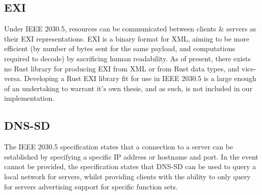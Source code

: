 \subsection{EXI}
Under IEEE 2030.5, resources can be communicated between clients \& servers as their EXI representations. EXI is a binary format for XML, aiming to be more efficient (by number of bytes sent for the same payload, and computations required to decode) by sacrificing human readability. As of present, there exists no Rust library for producing EXI from XML or from Rust data types, and vice-versa.
Developing a Rust EXI library fit for use in IEEE 2030.5 is a large enough of an undertaking to warrant it's own thesis, and as such, is not included in our implementation.

\subsection{DNS-SD}
The IEEE 2030.5 specification states that a connection to a server can be established by specifying a specific IP address or hostname and port. In the event cannot be provided, the specification states that DNS-SD can be used to query a local network for servers, whilst providing clients with the ability to only query for servers advertising support for specific function sets. 
